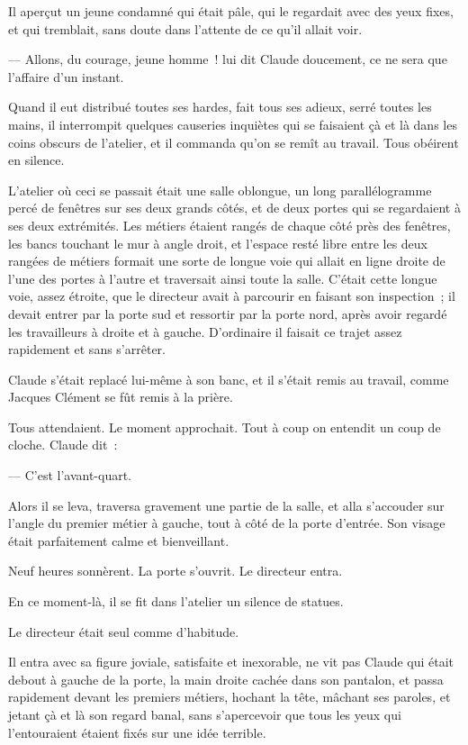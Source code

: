 \documentclass[french,twoside]{book} %
\begin{document}
Il aperçut un jeune condamné qui était pâle, qui le regardait avec des yeux fixes, et qui tremblait, sans doute dans l’attente de ce qu’il allait voir.\par
— Allons, du courage, jeune homme ! lui dit Claude doucement, ce ne sera que l’affaire d’un instant.\par
Quand il eut distribué toutes ses hardes, fait tous ses adieux, serré toutes les mains, il interrompit quelques causeries inquiètes qui se faisaient çà et là dans les coins obscurs de l’atelier, et il commanda qu’on se remît au travail. Tous obéirent en silence.\par
L’atelier où ceci se passait était une salle oblongue, un long parallélogramme percé de fenêtres sur ses deux grands côtés, et de deux portes qui se regardaient à ses deux extrémités. Les métiers étaient rangés de chaque côté près des fenêtres, les bancs touchant le mur à angle droit, et l’espace resté libre entre les deux rangées de métiers formait une sorte de longue voie qui allait en ligne droite de l’une des portes à l’autre et traversait ainsi toute la salle. C’était cette longue voie, assez étroite, que le directeur avait à parcourir en faisant son inspection ; il devait entrer par la porte sud et ressortir par la porte nord, après avoir regardé les travailleurs à droite et à gauche. D’ordinaire il faisait ce trajet assez rapidement et sans s’arrêter.\par
Claude s’était replacé lui-même à son banc, et il  s’était remis au travail, comme Jacques Clément se fût remis à la prière.\par
Tous attendaient. Le moment approchait. Tout à coup on entendit un coup de cloche. Claude dit :\par
— C’est l’avant-quart.\par
Alors il se leva, traversa gravement une partie de la salle, et alla s’accouder sur l’angle du premier métier à gauche, tout à côté de la porte d’entrée. Son visage était parfaitement calme et bienveillant.\par
Neuf heures sonnèrent. La porte s’ouvrit. Le directeur entra.\par
En ce moment-là, il se fit dans l’atelier un silence de statues.\par
Le directeur était seul comme d’habitude.\par
Il entra avec sa figure joviale, satisfaite et inexorable, ne vit pas Claude qui était debout à gauche de la porte, la main droite cachée dans son pantalon, et passa rapidement devant les premiers métiers, hochant la tête, mâchant ses paroles, et jetant çà et là son regard banal, sans s’apercevoir que tous les yeux qui l’entouraient étaient fixés sur une idée terrible.\par
\end{document}
